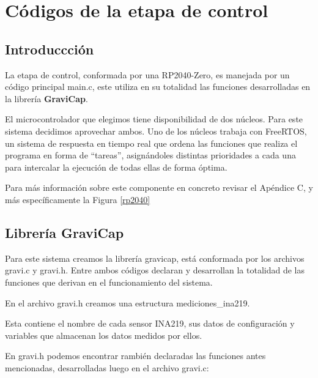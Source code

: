         \section{Códigos de la etapa de control}
        
            \subsection{Introduccción}
                La etapa de control, conformada por una RP2040-Zero, es manejada por un código principal main.c, este utiliza en su totalidad las funciones desarrolladas en la librería \textcolor{dark_violet}{\textbf{GraviCap}}.\par
                El microcontrolador que elegimos tiene disponibilidad de dos núcleos. Para este sistema decidimos aprovechar ambos. Uno de los núcleos trabaja con FreeRTOS, un sistema de respuesta en tiempo real que ordena las funciones que realiza el programa en forma de “tareas”, asignándoles distintas prioridades a cada una para intercalar la ejecución de todas ellas de forma óptima.\par
                Para más información sobre este componente en concreto revisar el Apéndice C, y más específicamente la Figura \ref{rp2040}\par
            
            \subsection{Librería \textcolor{dark_violet}{\textbf{GraviCap}}}
                Para este sistema creamos la librería gravicap, está conformada por los archivos gravi.c y gravi.h. Entre ambos códigos declaran y desarrollan la totalidad de las funciones que derivan en el funcionamiento del sistema.\par
                En el archivo gravi.h creamos una estructura mediciones\_ina219.\par
                \par
                Esta contiene el nombre de cada sensor INA219, sus datos de configuración y variables que almacenan los datos medidos por ellos.\par
                En gravi.h podemos encontrar rambién declaradas las funciones antes mencionadas, desarrolladas luego en el archivo gravi.c:\par
                

